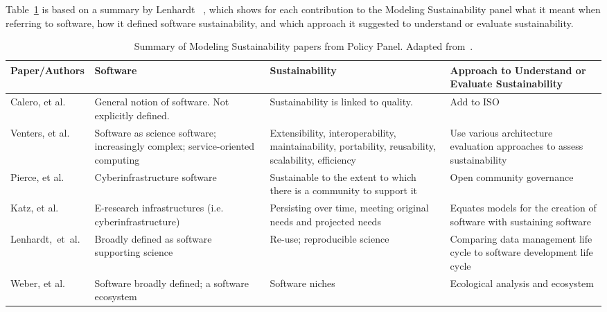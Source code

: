 \documentclass[11pt, oneside]{amsart}
\begin{document}
Table~\ref{tab:defining-sustainability} is based on a summary 
by Lenhardt ~\cite{lenhardt-wssspe1-panel}, which shows for each
contribution to the Modeling Sustainability panel what it meant when
referring to software, how it defined software sustainability, and
which approach it suggested to understand or evaluate sustainability.
\begin{table}[t]
  \begin{scriptsize}
    \begin{center}
      \caption{Summary of Modeling Sustainability papers from Policy Panel.  Adapted from~\cite{lenhardt-wssspe1-panel}.}
      \label{tab:defining-sustainability}
      \begin{tabular}{|p{2.3cm}|p{3.6cm}|p{4.4cm}|p{4.8cm}|}
                \hline
{\bf Paper/Authors}
& {\bf Software}
& {\bf Sustainability}
& {\bf Approach to Understand or Evaluate Sustainability} \\
                \hline
Calero, et al.~\cite{Calero_WSSSPE}
& General notion of software. Not explicitly defined.
& Sustainability is linked to quality.
& Add to ISO \\
                \hline
Venters, et al.~\cite{Venters_WSSSPE}
& Software as science software; increasingly complex; service-oriented computing
& Extensibility, interoperability, maintainability, portability, reusability, scalability, efficiency
& Use various architecture evaluation approaches to assess sustainability \\
                \hline
Pierce, et al.~\cite{Pierce_WSSSPE}
& Cyberinfrastructure software
& Sustainable to the extent to which there is a community to support it
& Open community governance \\
                \hline
Katz, et al.~\cite{Katz_WSSSPE}
& E-research infrastructures (i.e. cyberinfrastructure)
& Persisting over time, meeting original needs and projected needs
& Equates models for the creation of software with sustaining software \\
                \hline
Lenhardt,~et~al.~\cite{Lenhardt_WSSSPE}
& Broadly defined as software supporting science
& Re-use; reproducible science
& Comparing data management life cycle to software development life cycle \\
                \hline
Weber, et al.~\cite{Weber_WSSSPE}
& Software broadly defined; a software ecosystem
& Software niches
& Ecological analysis and ecosystem \\
                \hline
     \end{tabular}
    \end{center}
  \end{scriptsize}
\end{table}
\end{document}
